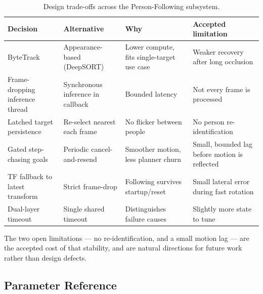 \begin{table}[h!]
\centering
\caption{Design trade-offs across the Person-Following subsystem.}
\label{tab:tradeoffs}
\begin{tabular}{|p{}|p{}|p{}|p{}|}
\hline
\textbf{Decision} & \textbf{Alternative} & \textbf{Why} & \textbf{Accepted limitation} \\
\hline
ByteTrack & Appearance-based (DeepSORT) & Lower compute, fits single-target use case & Weaker recovery after long occlusion \\
\hline
Frame-dropping inference thread & Synchronous inference in callback & Bounded latency & Not every frame is processed \\
\hline
Latched target persistence & Re-select nearest each frame & No flicker between people & No person re-identification \\
\hline
Gated step-chasing goals & Periodic cancel-and-resend & Smoother motion, less planner churn & Small, bounded lag before motion is reflected \\
\hline
TF fallback to latest transform & Strict frame-drop & Following survives startup/reset & Small lateral error during fast rotation \\
\hline
Dual-layer timeout & Single shared timeout & Distinguishes failure causes & Slightly more state to tune \\
\hline
\end{tabular}
\end{table}
 
The two open limitations --- no re-identification, and a small motion lag --- are the accepted cost of that stability, and are natural directions for future work rather than design defects.
 
\subsection{Parameter Reference}
\label{sec:appendix_parameters}
 
